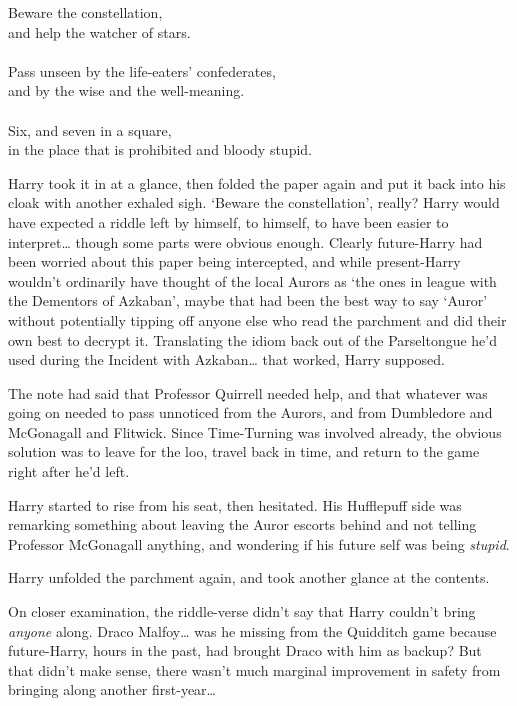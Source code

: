 \begin{writtenNote}
Beware the constellation,\\
and help the watcher of stars.\\
\\
Pass unseen by the life-eaters' confederates,\\
and by the wise and the well-meaning.\\
\\
Six, and seven in a square,\\
in the place that is prohibited and bloody stupid.
\end{writtenNote}

Harry took it in at a glance, then folded the paper again and put it back into 
his cloak with another exhaled sigh. `Beware the constellation', really? Harry 
would have expected a riddle left by himself, to himself, to have been easier 
to interpret{\ldots} though some parts were obvious enough. Clearly 
future-Harry had been worried about this paper being intercepted, and while 
present-Harry wouldn't ordinarily have thought of the local Aurors as `the ones 
in league with the Dementors of Azkaban', maybe that had been the best way to 
say `Auror' without potentially tipping off anyone else who read the parchment 
and did their own best to decrypt it. Translating the idiom back out of the 
Parseltongue he'd used during the Incident with Azkaban{\ldots} that worked, 
Harry supposed.

The note had said that Professor Quirrell needed help, and that whatever was 
going on needed to pass unnoticed from the Aurors, and from Dumbledore and 
McGonagall and Flitwick. Since Time-Turning was involved already, the obvious 
solution was to leave for the loo, travel back in time, and return to the game 
right after he'd left.

Harry started to rise from his seat, then hesitated. His Hufflepuff side was 
remarking something about leaving the Auror escorts behind and not telling 
Professor McGonagall anything, and wondering if his future self was being 
\emph{stupid}.

Harry unfolded the parchment again, and took another glance at the contents.

On closer examination, the riddle-verse didn't say that Harry couldn't bring 
\emph{anyone} along. Draco Malfoy{\ldots} was he missing from the Quidditch 
game because future-Harry, hours in the past, had brought Draco with him as 
backup? But that didn't make sense, there wasn't much marginal improvement in 
safety from bringing along another first-year{\ldots}

